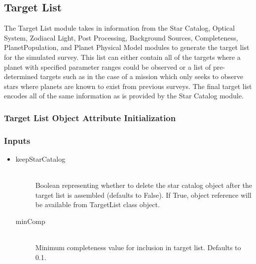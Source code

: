 \documentclass[cleanfoot]{asme2ej}
\begin{document}

\subsection{Target List}
The Target List module takes in information from the Star Catalog, Optical System, Zodiacal Light, Post Processing, Background Sources, Completeness, PlanetPopulation, and Planet Physical Model modules to generate the target list for the simulated survey.  This list can either contain all of the targets where a planet with specified parameter ranges could be observed or a list of pre-determined targets such as in the case of a mission which only seeks to observe stars where planets are known to exist from previous surveys.  The final target list encodes all of the same information as is provided by the Star Catalog module.

\label{sec:targetlist}
\subsubsection{Target List Object Attribute Initialization}
\subsubsection*{Inputs}
\begin{itemize}
    \item 
    \begin{description}
        \item[keepStarCatalog] \hfill \\
        Boolean representing whether to delete the star catalog object after the target list is assembled (defaults to False).  If True, object reference will be available from TargetList class object.
        \item[minComp] \hfill \\
        Minimum completeness value for inclusion in target list.  Defaults to 0.1.
    \end{description}
\end{itemize}
\end{document}
